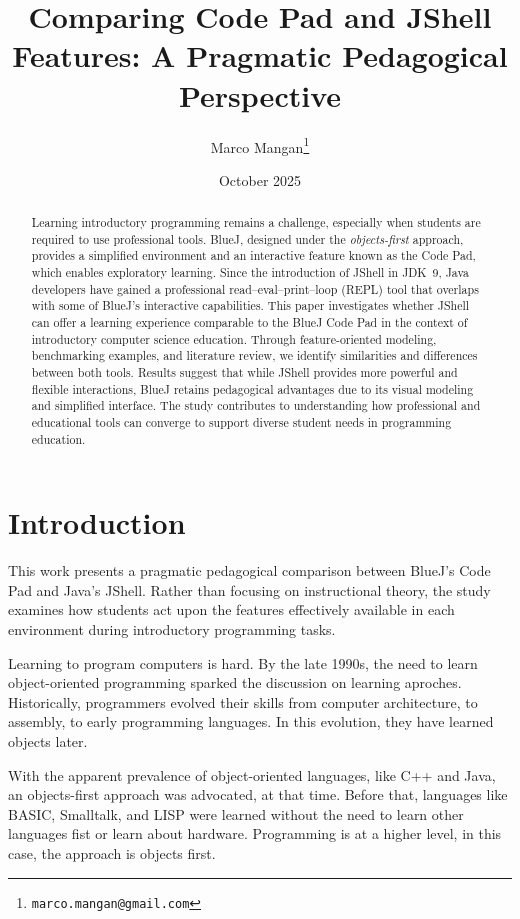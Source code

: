 \documentclass{article}
\title{Comparing Code Pad and JShell Features: A Pragmatic Pedagogical Perspective}
\author{Marco Mangan\thanks{\texttt{marco.mangan@gmail.com}}}
\date{October 2025}
\begin{document}
\maketitle

\begin{abstract}
Learning introductory programming remains a challenge, especially when students are required to use professional tools. 
BlueJ, designed under the \textit{objects-first} approach, provides a simplified environment and an interactive feature known as the Code Pad, which enables exploratory learning. 
Since the introduction of JShell in JDK~9, Java developers have gained a professional read--eval--print--loop (REPL) tool that overlaps with some of BlueJ's interactive capabilities. 
This paper investigates whether JShell can offer a learning experience comparable to the BlueJ Code Pad in the context of introductory computer science education. 
Through feature-oriented modeling, benchmarking examples, and literature review, we identify similarities and differences between both tools. 
Results suggest that while JShell provides more powerful and flexible interactions, BlueJ retains pedagogical advantages due to its visual modeling and simplified interface. 
The study contributes to understanding how professional and educational tools can converge to support diverse student needs in programming education.
\end{abstract}

\section{Introduction}

This work presents a pragmatic pedagogical comparison between BlueJ’s Code Pad and Java’s JShell.
Rather than focusing on instructional theory, the study examines how students act upon the features effectively available in each environment during introductory programming tasks.

Learning to program computers is hard. By the late 1990s, the need to learn object-oriented programming sparked the discussion on learning aproches. Historically, programmers evolved their skills from computer architecture, to assembly, to early programming languages. In this evolution, they have learned objects later.

With the apparent prevalence of object-oriented languages, like C++ and Java, an objects-first approach was advocated, at that time. Before that, languages like BASIC, Smalltalk, and LISP were learned without the need to learn other languages fist or learn about hardware. Programming is at a higher level, in this case, the approach is objects first.
\end{document}
